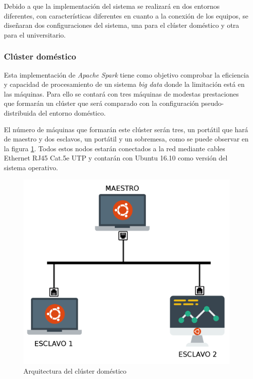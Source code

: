 Debido a que la implementación del sistema se realizará en dos entornos diferentes, con características diferentes en cuanto a la conexión de los equipos, se diseñaran dos configuraciones del sistema, una para el clúster doméstico y otra para el universitario.

\subsubsection{Clúster doméstico \label{disDomestico}}
Esta implementación de \textit{Apache Spark} tiene como objetivo comprobar la eficiencia y capacidad de procesamiento de un sistema \textit{big data} donde la limitación está en las máquinas. Para ello se contará con tres máquinas de modestas prestaciones que formarán un clúster que será comparado con la configuración pseudo-distribuida del entorno doméstico.

El número de máquinas que formarán este clúster serán tres, un portátil que hará de maestro y dos esclavos, un portátil y un sobremesa, como se puede observar en la figura \ref{fig:clusterDomestico}. Todos estos nodos estarán conectados a la red mediante cables Ethernet RJ45 Cat.5e UTP y contarán con Ubuntu 16.10 \cite{ubuntu} como versión del sistema operativo.

\begin{figure}[htp!]
\centering
\caption{Arquitectura del clúster doméstico}
\label{fig:clusterDomestico}
\includegraphics[scale=0.3]{graphics/clusterDomestico}
\end{figure}

